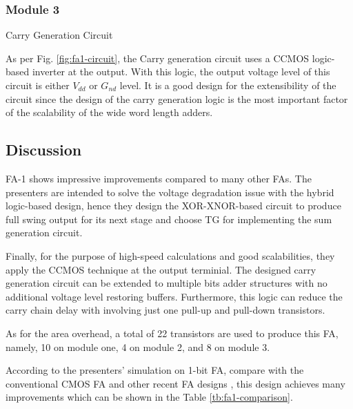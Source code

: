 \documentclass[conference]{IEEEtran}
\begin{document}
\subsubsection{Module 3}Carry Generation Circuit

As per Fig. \ref{fig:fa1-circuit}, the Carry generation circuit uses a CCMOS logic-based inverter at the output.
With this logic, the output voltage level of this circuit is either \(V_{dd}\) or \(G_{nd}\) level.
It is a good design for the extensibility of the circuit
since the design of the carry generation logic is the most important factor of the scalability of the wide word length adders.


\subsection{Discussion}

FA-1 shows impressive improvements compared to many other FAs.
The presenters are intended to solve the voltage degradation issue with the hybrid logic-based design,
hence they design the XOR-XNOR-based circuit to produce full swing output for its next stage
and choose TG for implementing the sum generation circuit.

Finally, for the purpose of high-speed calculations and good scalabilities,
they apply the CCMOS technique at the output terminial.
The designed carry generation circuit can be extended to multiple bits adder structures with no additional voltage level restoring buffers.
Furthermore, this logic can reduce the carry chain delay with involving just one pull-up and pull-down transistors.

As for the area overhead, a total of 22 transistors are used to produce this FA, namely, 10 on module one, 4 on module 2, and 8 on module 3.

According to the presenters' simulation on 1-bit FA,
compare with the conventional CMOS FA \cite{weste2015cmos} and other recent FA designs \cite{15484823, 9068497,18743001},
this design achieves many improvements which can be shown in the Table \ref{tb:fa1-comparison}.
\end{document}
